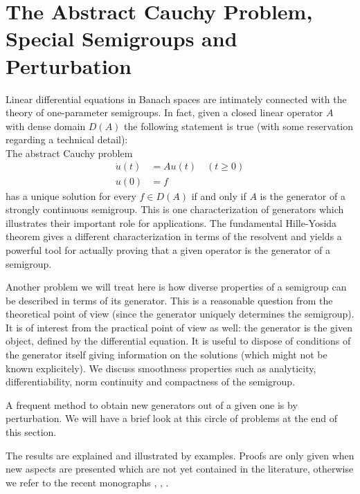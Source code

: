 \section{The Abstract Cauchy Problem, Special Semigroups and Perturbation} \label{sec:a2-1}%
\hspace{1cm}{\Large by Wolfgang Arendt}
\vspace{.5cm}
\newline
Linear differential equations in Banach spaces are intimately connected with the theory of one-parameter semigroups.
In fact, given a closed linear operator $A$ with dense domain $D(A)$ the following statement is true (with some reservation regarding a technical detail): \\
The abstract Cauchy problem
\begin{align*}
\dot{u}(t) &= Au(t) \quad (t \geq 0) \\
u(0) &= f 
\end{align*}
has a unique solution for every $f \in D(A)$ if and only if $A$ is the generator of a strongly continuous semigroup.
This is one characterization of generators which illustrates their important role for applications.
The fundamental Hille-Yosida theorem gives a different characterization in terms of the resolvent and yields a powerful tool for actually proving that a given operator is the generator of a semigroup.

Another problem we will treat here is how diverse properties of a semigroup can be described in terms of its generator.
This is a reasonable question from the theoretical point of view (since the generator uniquely determines the semigroup).
It is of interest from the practical point of view as well: the generator is the given object, defined by the differential equation.
It is useful to dispose of conditions of the generator itself giving information on the solutions (which might not be known explicitely).
We discuss smoothness properties such as analyticity, differentiability, norm continuity and compactness of the semigroup.

A frequent method to obtain new generators out of a given one is by perturbation.
We will have a brief look at this circle of problems at the end of this section.

The results are explained and illustrated by examples.
Proofs are only given when new aspects are presented which are not yet contained in the literature, otherwise we refer to the recent monographs \citet{davies:1980}, \citet{goldstein:1985a}, \citet{pazy:1983}.
